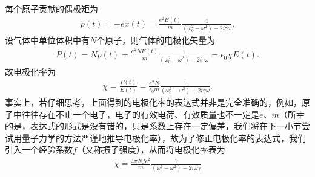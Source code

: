 \documentclass{assignment}
\begin{document}
每个原子贡献的偶极矩为
\begin{align}
    p(t)=-ex(t)=\frac{e^2E(t)}{m}\frac{1}{(\omega_0^2-\omega^2)-2i\gamma\omega}.
\end{align}
设气体中单位体积中有$N$个原子，则气体的电极化矢量为
\begin{align}
    P(t)=Np(t)=\frac{e^2NE(t)}{m}\frac{1}{(\omega_0^2-\omega^2)-2i\gamma\omega}=\epsilon_0\chi E(t).
\end{align}
故电极化率为
\begin{align}
    \chi=\frac{P(t)}{E(t)}=\frac{e^2N}{\epsilon_0m}\frac{1}{(\omega_0^2-\omega^2)-2i\gamma\omega}.
\end{align}
事实上，若仔细思考，上面得到的电极化率的表达式并非是完全准确的，例如，原子中往往存在不止一个电子，电子的有效电荷、有效质量也不一定是$e$、$m$（所幸的是，表达式的形式是没有错的，只是系数上存在一定偏差，我们将在下一小节尝试用量子力学的方法严谨地推导电极化率），故为了修正电极化率的表达式，我们引入一个经验系数$f$（又称振子强度），从而将电极化率表为
\begin{align}
    \chi=\frac{4\pi Nfe^2}{m}\frac{1}{(\omega_0^2-\omega^2)-2i\omega\gamma}
\end{align}
\end{document}
